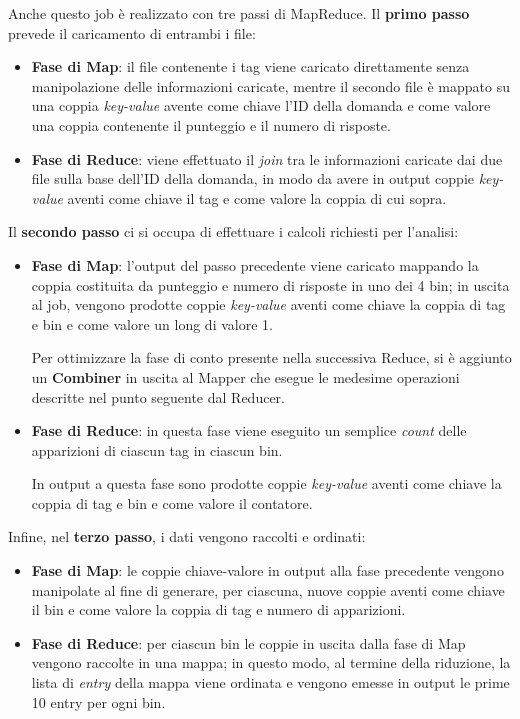  Anche questo job è realizzato con tre passi di MapReduce.
  Il \textbf{primo passo} prevede il caricamento di entrambi i file:
  \begin{itemize}
    \item
    \textbf{Fase di Map}:
      il file contenente i tag viene caricato direttamente senza manipolazione delle informazioni caricate,
      mentre il secondo file è mappato su una coppia \textit{key-value} avente come chiave l'ID della domanda
      e come valore una coppia contenente il punteggio e il numero di risposte.

    \item
      \textbf{Fase di Reduce}:
      viene effettuato il \textit{join} tra le informazioni caricate dai due file sulla base dell'ID della domanda,
      in modo da avere in output coppie \textit{key-value} aventi come chiave il tag e come valore la coppia di cui sopra.
  \end{itemize}

  Il \textbf{secondo passo} ci si occupa di effettuare i calcoli richiesti per l'analisi:
  \begin{itemize}
    \item
      \textbf{Fase di Map}:
      l'output del passo precedente viene caricato mappando la coppia costituita da punteggio e numero di risposte in uno dei 4 bin;
      in uscita al job, vengono prodotte coppie \textit{key-value} aventi come chiave la coppia di tag e bin e come valore un long di valore 1.

      Per ottimizzare la fase di conto presente nella successiva Reduce, si è aggiunto un \textbf{Combiner} in uscita al Mapper che esegue le medesime operazioni
      descritte nel punto seguente dal Reducer.
    \item
      \textbf{Fase di Reduce}:
      in questa fase viene eseguito un semplice \textit{count} delle apparizioni di ciascun tag in ciascun bin.

      In output a questa fase sono prodotte coppie \textit{key-value} aventi come chiave la coppia di tag e bin e come valore il contatore.
  \end{itemize}

  Infine, nel \textbf{terzo passo}, i dati vengono raccolti e ordinati:
  \begin{itemize}
    \item
      \textbf{Fase di Map}:
      le coppie chiave-valore in output alla fase precedente vengono manipolate
      al fine di generare, per ciascuna, nuove coppie aventi come chiave il bin e come valore la coppia di tag e numero di apparizioni.
    \item
      \textbf{Fase di Reduce}:
      per ciascun bin le coppie in uscita dalla fase di Map vengono raccolte in una mappa;
      in questo modo, al termine della riduzione, la lista di \textit{entry} della mappa viene ordinata e vengono emesse in output le prime 10 entry per ogni bin.
  \end{itemize}

